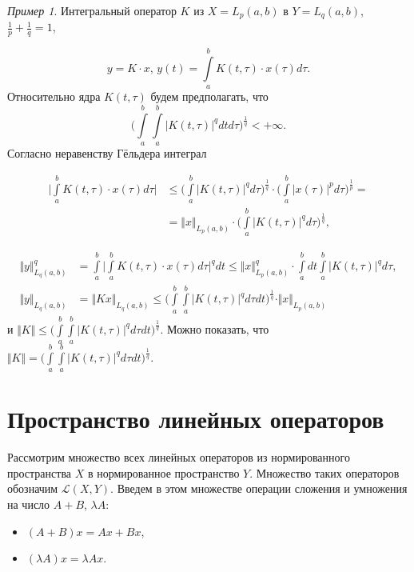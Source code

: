 \documentclass[12pt,a4paper,titlepage,oneside]{book}
\theoremstyle{definition}
\theoremstyle{plain}
\theoremstyle{break}
\theoremstyle{remark}
\theoremstyle{remark}
\newtheorem*{example}{Пример}
\theoremstyle{remark}
\theoremstyle{remark}
\theoremstyle{plain}
\theoremstyle{plain}
\begin{document}
\begin{example}
Интегральный оператор $K$ из $X=L_p(a,b)$ в $Y=L_q(a,b)$, $
\frac{1}{p}+\frac{1}{q}=1$,

$$y=K\cdot x \mbox{, } y(t)=\displaystyle\int\limits_a^b K(t,\tau)\cdot x(\tau)d\tau.$$
Относительно ядра $K(t,\tau)$ будем предполагать, что 
$${ \Big( \displaystyle\int\limits_a^b \displaystyle\int\limits_a^b { \big\vert K(t,\tau) \big\vert} ^q dtd\tau \Big) ^\frac{1}{q}} < +\infty.$$
Согласно неравенству Гёльдера интеграл

\begin{align*}
\Big\vert \displaystyle\int\limits_a^b K(t,\tau)\cdot x(\tau)d\tau \Big\vert &\leqslant \Big( \displaystyle\int\limits_a^b { \big\vert K(t,\tau) \big\vert}^q d\tau \Big)^\frac{1}{q} \cdot \Big( \displaystyle\int\limits_a^b { \big\vert x(\tau) \big\vert} ^p d\tau \Big)^\frac{1}{p} =\\
&= \Vert x \Vert _{L_p(a,b)} \cdot \Big( \displaystyle\int\limits_a^b {\big\vert K(t,\tau) \big\vert}^q d\tau \Big)^\frac{1}{q}
,
\end{align*}

\begin{align*}
{\Vert y \Vert}^q _{L_q(a,b)} &=\displaystyle\int\limits_a^b { \Big\vert \displaystyle\int\limits_a^b K(t,\tau)\cdot x(\tau) d\tau \Big\vert^{q}} dt \leqslant {\Vert x \Vert}^q _{L_p(a,b)} \cdot \displaystyle\int\limits_a^b dt \displaystyle\int\limits_a^b {\vert K(t,\tau)\vert} ^q d\tau,\\
{\Vert y \Vert}_{L_q(a,b)} &=
{\Vert Kx\Vert}_{L_q(a,b)} \leqslant { \Big( \displaystyle\int\limits_a^b \displaystyle\int\limits_a^b { \big\vert K(t,\tau) \big\vert} ^q d\tau dt \Big)^\frac{1}{q}}\cdot \Vert x \Vert _{L_p(a,b)}
\end{align*}
и $\Vert K \Vert \leqslant {\Big( \displaystyle\int\limits_a^b \displaystyle\int\limits_a^b { \big\vert K(t,\tau) \big\vert} ^q d\tau dt \Big)^\frac{1}{q}}$.
Можно показать, что $\Vert K \Vert = 
{ \Big( \displaystyle\int\limits_a^b \displaystyle\int\limits_a^b { \big\vert K(t,\tau) \big\vert} ^q d\tau dt \Big)^\frac{1}{q}}.$
\end{example}

\section{Пространство линейных операторов}
Рассмотрим множество всех линейных операторов из нормированного пространства $X$ в нормированное пространство $Y$. Множество таких операторов обозначим $\mathcal{L}(X,Y)$. Введем в этом множестве операции сложения и умножения на число $A + B$, $\lambda A$:
\begin{itemize}
	\item $(A+B)x = Ax+Bx$,
	\item $(\lambda A)x = \lambda Ax$.
\end{itemize}
\end{document}

